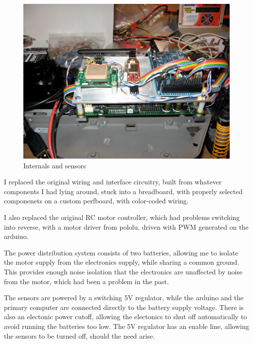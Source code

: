 
\begin{figure}[h!]
\includegraphics[width=1.0\textwidth]{hardware}
\caption{Internals and sensors}
\end{figure}

I replaced the original wiring and interface circuitry, built from whatever components I had lying around, stuck into a breadboard, with properly selected componenets on a custom perfboard, with color-coded wiring.

I also replaced the original RC motor controller, which had problems switching into reverse, with a motor driver from pololu, driven with PWM generated on the arduino.

The power distribution system consists of two batteries, allowing me to isolate the motor supply from the electronics supply, while sharing a common ground. This provides enough noise isolation that the electronics are unaffected by noise from the motor, which had been a problem in the past.

The sensors are powered by a switching 5V regulator, while the arduino and the primary computer are connected directly to the battery supply voltage. There is also an electonic power cutoff, allowing the electonics to shut off automatically to avoid running the batteries too low. The 5V regulator has an enable line, allowing the sensors to be turned off, should the need arise.
